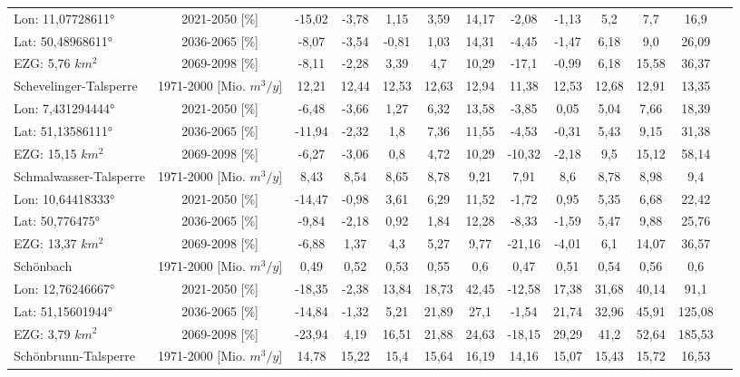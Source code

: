 \begin{longtable}{@{\extracolsep{\fill}}lc|ccccc||cccccc}
\cline{2-13} 
Lon: 11,07728611° & 2021-2050 [\%]  & -15,02 & -3,78 & 1,15 & 3,59 & 14,17 & -2,08 & -1,13 & 5,2 & 7,7 & 16,9 & \\ 
Lat: 50,48968611° & 2036-2065 [\%]  & -8,07 & -3,54 & -0,81 & 1,03 & 14,31 & -4,45 & -1,47 & 6,18 & 9,0 & 26,09 & \\ 
EZG: 5,76 $km^2$ & 2069-2098 [\%]  & -8,11 & -2,28 & 3,39 & 4,7 & 10,29 & -17,1 & -0,99 & 6,18 & 15,58 & 36,37 & \\ 
\hline 
Schevelinger-Talsperre & 1971-2000 [Mio. $m^3/y$]  & 12,21 & 12,44 & 12,53 & 12,63 & 12,94 & 11,38 & 12,53 & 12,68 & 12,91 & 13,35 & \\ 
\cline{2-13} 
Lon: 7,431294444° & 2021-2050 [\%]  & -6,48 & -3,66 & 1,27 & 6,32 & 13,58 & -3,85 & 0,05 & 5,04 & 7,66 & 18,39 & \\ 
Lat: 51,13586111° & 2036-2065 [\%]  & -11,94 & -2,32 & 1,8 & 7,36 & 11,55 & -4,53 & -0,31 & 5,43 & 9,15 & 31,38 & \\ 
EZG: 15,15 $km^2$ & 2069-2098 [\%]  & -6,27 & -3,06 & 0,8 & 4,72 & 10,29 & -10,32 & -2,18 & 9,5 & 15,12 & 58,14 & \\ 
\hline 
Schmalwasser-Talsperre & 1971-2000 [Mio. $m^3/y$]  & 8,43 & 8,54 & 8,65 & 8,78 & 9,21 & 7,91 & 8,6 & 8,78 & 8,98 & 9,4 & \\ 
\cline{2-13} 
Lon: 10,64418333° & 2021-2050 [\%]  & -14,47 & -0,98 & 3,61 & 6,29 & 11,52 & -1,72 & 0,95 & 5,35 & 6,68 & 22,42 & \\ 
Lat: 50,776475° & 2036-2065 [\%]  & -9,84 & -2,18 & 0,92 & 1,84 & 12,28 & -8,33 & -1,59 & 5,47 & 9,88 & 25,76 & \\ 
EZG: 13,37 $km^2$ & 2069-2098 [\%]  & -6,88 & 1,37 & 4,3 & 5,27 & 9,77 & -21,16 & -4,01 & 6,1 & 14,07 & 36,57 & \\ 
\hline 
Schönbach & 1971-2000 [Mio. $m^3/y$]  & 0,49 & 0,52 & 0,53 & 0,55 & 0,6 & 0,47 & 0,51 & 0,54 & 0,56 & 0,6 & \\ 
\cline{2-13} 
Lon: 12,76246667° & 2021-2050 [\%]  & -18,35 & -2,38 & 13,84 & 18,73 & 42,45 & -12,58 & 17,38 & 31,68 & 40,14 & 91,1 & \\ 
Lat: 51,15601944° & 2036-2065 [\%]  & -14,84 & -1,32 & 5,21 & 21,89 & 27,1 & -1,54 & 21,74 & 32,96 & 45,91 & 125,08 & \\ 
EZG: 3,79 $km^2$ & 2069-2098 [\%]  & -23,94 & 4,19 & 16,51 & 21,88 & 24,63 & -18,15 & 29,29 & 41,2 & 52,64 & 185,53 & \\ 
\hline 
Schönbrunn-Talsperre & 1971-2000 [Mio. $m^3/y$]  & 14,78 & 15,22 & 15,4 & 15,64 & 16,19 & 14,16 & 15,07 & 15,43 & 15,72 & 16,53 & \\ 

\end{longtable}
